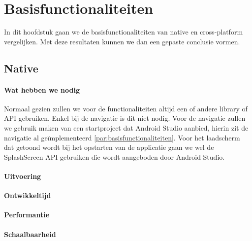 
\chapter{Basisfunctionaliteiten}%
\label{ch:basisfunctionaliteiten}

In dit hoofdstuk gaan we de basisfunctionaliteiten van native en cross-platform vergelijken. 
Met deze resultaten kunnen we dan een gepaste conclusie vormen.

\section{Native}
\subsubsection{Wat hebben we nodig}
Normaal gezien zullen we voor de functionaliteiten altijd een of andere library of API gebruiken. 
Enkel bij de navigatie is dit niet nodig. Voor de navigatie zullen we gebruik maken van een 
startproject dat Android Studio aanbied, hierin zit de navigatie al geïmplementeerd 
\ref{par:basisfunctionaliteiten}. Voor het laadscherm dat getoond wordt bij het opstarten van 
de applicatie gaan we wel de SplashScreen API gebruiken die wordt aangeboden door Android Studio.

\subsubsection{Uitvoering}



\subsubsection{Ontwikkeltijd}



\subsubsection{Performantie}



\subsubsection{Schaalbaarheid}

